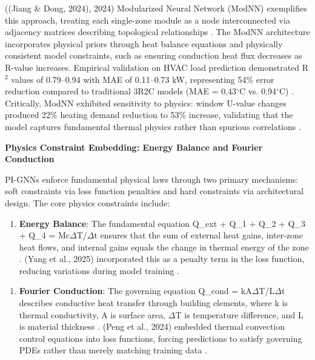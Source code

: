 \documentclass[12pt,a4paper]{article}
\begin{document}
((Jiang \& Dong, 2024), 2024) Modularized Neural Network (ModNN) exemplifies this approach, treating each single-zone module as a node interconnected via adjacency matrices describing topological relationships \cite{ref18}. The ModNN architecture incorporates physical priors through heat balance equations and physically consistent model constraints, such as ensuring conduction heat flux decreases as R-value increases. Empirical validation on HVAC load prediction demonstrated R$^2$ values of 0.79--0.94 with MAE of 0.11--0.73 kW, representing 54\% error reduction compared to traditional 3R2C models (MAE = 0.43$^\circ$C vs. 0.94$^\circ$C) \cite{ref19}. Critically, ModNN exhibited sensitivity to physics: window U-value changes produced 22\% heating demand reduction to 53\% increase, validating that the model captures fundamental thermal physics rather than spurious correlations \cite{ref20}.

\textbf{Physics Constraint Embedding: Energy Balance and Fourier Conduction}

PI-GNNs enforce fundamental physical laws through two primary mechanisms: soft constraints via loss function penalties and hard constraints via architectural design. The core physics constraints include:

\begin{enumerate}
  \item \textbf{Energy Balance}: The fundamental equation Q\_ext + Q\_1 + Q\_2 + Q\_3 + Q\_4 = Mc$\Delta$T/$\Delta$t ensures that the sum of external heat gains, inter-zone heat flows, and internal gains equals the change in thermal energy of the zone \cite{ref21}. (Yang et al., 2025) incorporated this as a penalty term in the loss function, reducing variations during model training \cite{ref16}.
\end{enumerate}

\begin{enumerate}
  \item \textbf{Fourier Conduction}: The governing equation Q\_cond = kA$\Delta$T/L$\Delta$t describes conductive heat transfer through building elements, where k is thermal conductivity, A is surface area, $\Delta$T is temperature difference, and L is material thickness \cite{ref22}. (Peng et al., 2024) embedded thermal convection control equations into loss functions, forcing predictions to satisfy governing PDEs rather than merely matching training data \cite{ref17}.
\end{enumerate}
\end{document}
